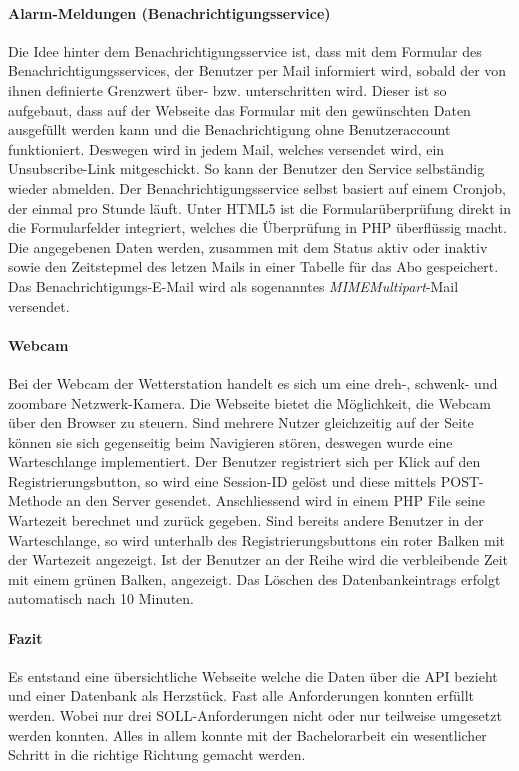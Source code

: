 \documentclass[10pt]{article}
\begin{document}
\begin{multicols}{2}
\paragraph{Alarm-Meldungen (Benachrichtigungsservice)}
Die Idee hinter dem Benachrichtigungsservice ist, dass mit dem  Formular des Benachrichtigungsservices, der Benutzer per Mail informiert wird, sobald der von ihnen definierte Grenzwert über- bzw. unterschritten wird.  Dieser ist so aufgebaut, dass auf der Webseite das Formular mit den gewünschten Daten ausgefüllt werden kann und die Benachrichtigung ohne Benutzeraccount funktioniert. Deswegen wird in jedem Mail, welches versendet wird, ein Unsubscribe-Link mitgeschickt. So kann der Benutzer den Service selbständig wieder abmelden. Der Benachrichtigungsservice selbst basiert auf einem Cronjob, der einmal pro Stunde läuft. Unter HTML5 ist die Formularüberprüfung direkt in die Formularfelder integriert, welches die Überprüfung in PHP überflüssig macht. Die angegebenen Daten werden, zusammen mit dem Status aktiv oder inaktiv sowie den Zeitstepmel des letzen Mails in einer Tabelle für das Abo gespeichert. Das Benachrichtigungs-E-Mail wird als sogenanntes \emph{MIMEMultipart}-Mail versendet.

\paragraph{Webcam}
Bei der Webcam der Wetterstation handelt es sich um eine dreh-, schwenk- und zoombare Netzwerk-Kamera. Die Webseite bietet die Möglichkeit, die Webcam über den Browser zu steuern. Sind mehrere Nutzer gleichzeitig auf der Seite können sie sich gegenseitig beim Navigieren stören, deswegen wurde eine Warteschlange implementiert. Der Benutzer registriert sich per Klick auf den Registrierungsbutton, so wird eine Session-ID gelöst und diese mittels POST-Methode an den Server gesendet. Anschliessend wird in einem PHP File seine Wartezeit berechnet und zurück gegeben. Sind bereits andere Benutzer in der Warteschlange, so wird unterhalb des Registrierungsbuttons ein roter Balken mit der Wartezeit angezeigt. Ist der Benutzer an der Reihe wird die verbleibende Zeit mit einem grünen Balken, angezeigt. Das Löschen des Datenbankeintrags erfolgt automatisch nach 10 Minuten.
\paragraph{Fazit}
Es entstand eine übersichtliche Webseite welche die Daten über die API bezieht und einer Datenbank als Herzstück. Fast alle Anforderungen konnten erfüllt werden. Wobei nur drei SOLL-Anforderungen nicht  oder nur teilweise umgesetzt werden konnten. Alles in allem konnte mit der Bachelorarbeit ein wesentlicher Schritt in die richtige Richtung gemacht werden. 
\end{multicols}
 
\end{document}

